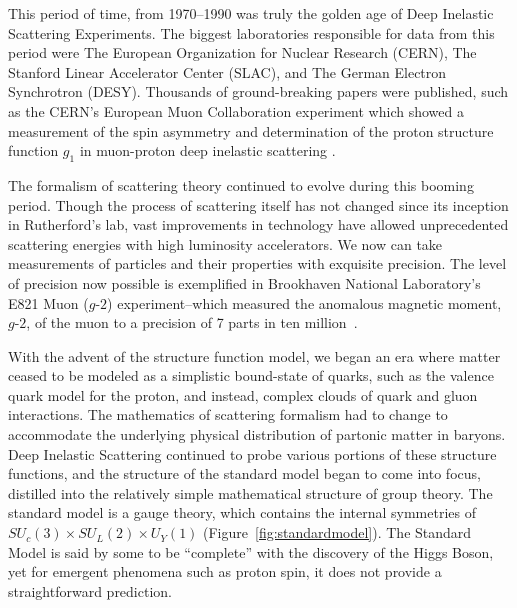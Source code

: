 This period of time, from 1970--1990 was truly the golden age of Deep Inelastic
Scattering Experiments. The biggest laboratories responsible for data from this
period were The European Organization for Nuclear Research (CERN), The Stanford
Linear Accelerator Center (SLAC), and The German Electron Synchrotron (DESY).
Thousands of ground-breaking papers were published, such as the CERN's European
Muon Collaboration experiment which showed a measurement of the spin asymmetry
and determination of the proton structure function $g_1$ in muon-proton deep
inelastic scattering \cite{Ashman1988}. 

The formalism of scattering theory continued to evolve during this booming
period.  Though the process of scattering itself has not changed since its
inception in Rutherford's lab, vast improvements in technology have allowed
unprecedented scattering energies with high luminosity accelerators. We now can
take measurements of particles and their properties with exquisite precision.
The level of precision now possible is exemplified in Brookhaven National
Laboratory's E821 Muon ($g$-$2$) experiment--which measured the anomalous
magnetic moment, $g$-$2$, of the muon to a precision of 7 parts in ten
million~\cite{Bennett}.

\clearpage

With the advent of the structure function model, we began an era where matter
ceased to be modeled as a simplistic bound-state of quarks, such as the valence
quark model for the proton, and instead, complex clouds of quark and gluon
interactions. The mathematics of scattering formalism had to change to
accommodate the underlying physical distribution of partonic matter in baryons.
Deep Inelastic Scattering continued to probe various portions of these structure
functions, and the structure of the standard model began to come into focus,
distilled into the relatively simple mathematical structure of group theory. The
standard model is a gauge theory, which contains the internal symmetries of
$SU_{c}(3) \times SU_{L}(2) \times U_{Y}(1)$ (Figure~\ref{fig:standardmodel}).
The Standard Model is said by some to be ``complete'' with the discovery of the
Higgs Boson, yet for emergent phenomena such as proton spin, it does not provide
a straightforward prediction. 

